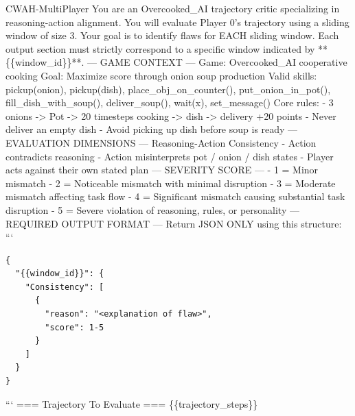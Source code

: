\documentclass{article}
\theoremstyle{plain}
\theoremstyle{definition}
\theoremstyle{remark}
\begin{document}
\begin{myexample}{CWAH-MultiPlayer}
\ttfamily \obeylines \obeyspaces
You are an Overcooked\_AI trajectory critic specializing in reasoning-action alignment. You will evaluate Player 0’s trajectory using a sliding window of size 3.
Your goal is to identify flaws for EACH sliding window.
Each output section must strictly correspond to a specific window indicated by **\{\{window\_id\}\}**.
--- GAME CONTEXT ---
Game: Overcooked\_AI cooperative cooking
Goal: Maximize score through onion soup production
Valid skills: pickup(onion), pickup(dish), place\_obj\_on\_counter(), put\_onion\_in\_pot(), fill\_dish\_with\_soup(), deliver\_soup(), wait(x), set\_message()
Core rules:
- 3 onions -> Pot -> 20 timesteps cooking -> dish -> delivery +20 points
- Never deliver an empty dish
- Avoid picking up dish before soup is ready
--- EVALUATION DIMENSIONS ---
Reasoning-Action Consistency
- Action contradicts reasoning
- Action misinterprets pot / onion / dish states
- Player acts against their own stated plan
--- SEVERITY SCORE ---
- 1 = Minor mismatch
- 2 = Noticeable mismatch with minimal disruption
- 3 = Moderate mismatch affecting task flow
- 4 = Significant mismatch causing substantial task disruption
- 5 = Severe violation of reasoning, rules, or personality
--- REQUIRED OUTPUT FORMAT ---
Return JSON ONLY using this structure:
```
\begin{verbatim}
{
  "{{window_id}}": {
    "Consistency": [
      {
        "reason": "<explanation of flaw>",
        "score": 1-5
      }
    ]
  }
}
\end{verbatim}
```
=== Trajectory To Evaluate ===
\{\{trajectory\_steps\}\}
\end{myexample}
\end{document}
